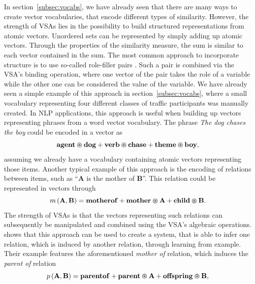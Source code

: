 In section~\ref{subsec:vocabs}, we have already seen that there are many ways to create vector vocabularies, that encode different types of similarity.
However, the strength of \acp{VSA} lies in the possibility to build structured representations from atomic vectors.
Unordered sets can be represented by simply adding up atomic vectors.
Through the properties of the similarity measure, the sum is similar to each vector contained in the sum.
The most common approach to incorporate structure is to use so-called role-filler pairs \parencite{Gayler2003}.
Such a pair is combined via the \ac{VSA}'s binding operation, where one vector of the pair takes the role of a variable while the other one can be considered the value of the variable.
We have already seen a simple example of this approach in section~\ref{subsec:vocabs}, where a small vocabulary representing four different classes of traffic participants was manually created.
In \ac{NLP} applications, this approach is useful when building up vectors representing phrases from a word vector vocabulary.
The phrase \textit{The dog chases the boy} could be encoded in a vector as
\begin{equation*}
	\mathbf{agent} \varoast \mathbf{dog} + \mathbf{verb} \varoast \mathbf{chase} + \mathbf{theme} \varoast \mathbf{boy},
\end{equation*}
assuming we already have a vocabulary containing atomic vectors representing those items.
Another typical example of this approach is the encoding of relations between items, such as \enquote{$\mathbf{A}$ is the mother of $\mathbf{B}$}.
This relation could be represented in vectors through
\begin{equation*}
	m \left(\mathbf{A}, \mathbf{B} \right) = \mathbf{motherof} + \mathbf{mother} \varoast \mathbf{A} + \mathbf{child} \varoast \mathbf{B}.
\end{equation*}
The strength of \acp{VSA} is that the vectors representing such relations can subsequently be manipulated and combined using the \ac{VSA}'s algebraic operations.
\textcite{Kanerva2000} shows that this approach can be used to create a system, that is able to infer one relation, which is induced by another relation, through learning from example.
Their example features the aforementioned \textit{mother of} relation, which induces the \textit{parent of} relation
\begin{equation*}
	p \left(\mathbf{A}, \mathbf{B} \right) = \mathbf{parentof} + \mathbf{parent} \varoast \mathbf{A} + \mathbf{offspring} \varoast \mathbf{B},
\end{equation*}
